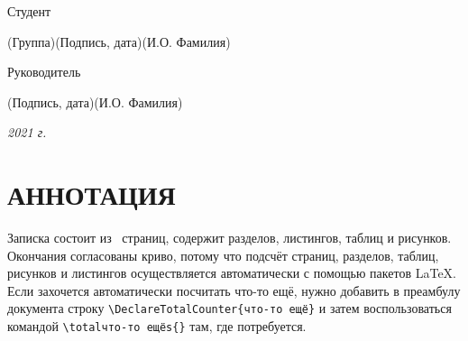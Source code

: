 \documentclass[14pt,russian]{scrartcl}
\begin{document}
\begin{titlepage}
\noindent Студент \underline{\hspace{1.5cm}} \hfill \underline{\hspace{4cm}}\quad
\underline{\hspace{4cm}}

\vspace{-2.1ex}
\noindent\hspace{9ex}\scriptsize{(Группа)}\normalsize\hspace{170pt}\hspace{2ex}\scriptsize{(Подпись, дата)}\normalsize\hspace{30pt}\hspace{6ex}\scriptsize{(И.О. Фамилия)}\normalsize

\bigskip

\noindent Руководитель  \hfill \underline{\hspace{4cm}}\quad
\underline{\hspace{4cm}}

\vspace{-2ex}
\noindent\hspace{13.5ex}\normalsize\hspace{170pt}\hspace{2ex}\scriptsize{(Подпись, дата)}\normalsize\hspace{30pt}\hspace{6ex}\scriptsize{(И.О. Фамилия)}\normalsize
\vfill

 


\begin{center}
\textsl{2021 г.}
\end{center}
\end{titlepage}

\renewcommand{\ttdefault}{pcr}

\setlength{\tabcolsep}{3pt}
\newpage
\setcounter{page}{2}
\section*{АННОТАЦИЯ}

Записка состоит из~\pageref{TotPages} страниц, содержит \totalsections{} разделов, \totallstlistings{} листингов, \totaltables{} таблиц и \totalfigures{} рисунков. Окончания согласованы криво, потому что подсчёт страниц, разделов, таблиц, рисунков и листингов осуществляется автоматически с помощью пакетов \LaTeX{}. Если захочется автоматически посчитать что-то ещё, нужно добавить в преамбулу документа строку \texttt{\textbackslash DeclareTotalCounter\{что-то ещё\}} и затем воспользоваться командой \texttt{\textbackslash totalчто-то ещёs\{\}} там, где потребуется.
\end{document}
